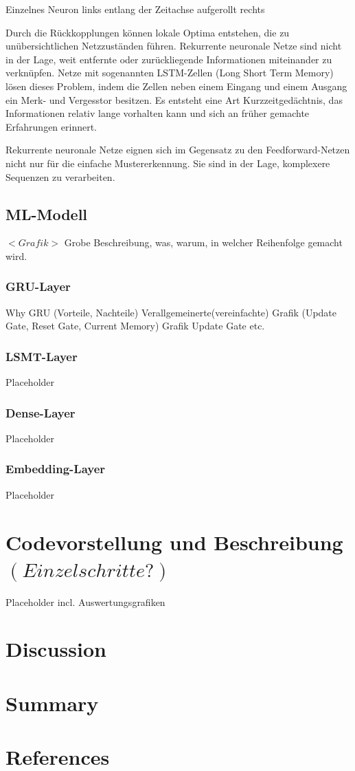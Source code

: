 \documentclass[12pt,a4paper]{article}
\begin{document}
Einzelnes Neuron links       \tab    entlang der Zeitachse aufgerollt rechts


Durch die Rückkopplungen können lokale Optima entstehen, die zu unübersichtlichen Netzzuständen führen. Rekurrente neuronale Netze sind nicht in der Lage, weit entfernte oder zurückliegende Informationen miteinander zu verknüpfen. Netze mit sogenannten LSTM-Zellen (Long Short Term Memory) lösen dieses Problem, indem die Zellen neben einem Eingang und einem Ausgang ein Merk- und Vergesstor besitzen. Es entsteht eine Art Kurzzeitgedächtnis, das Informationen relativ lange vorhalten kann und sich an früher gemachte Erfahrungen erinnert.

Rekurrente neuronale Netze eignen sich im Gegensatz zu den Feedforward-Netzen nicht nur für die einfache Mustererkennung. Sie sind in der Lage, komplexere Sequenzen zu verarbeiten. 

\subsection{ML-Modell}
$<Grafik>$ \newline
Grobe Beschreibung, was, warum, in welcher Reihenfolge gemacht wird.
\subsubsection{GRU-Layer}
Why GRU (Vorteile, Nachteile) \newline
Verallgemeinerte(vereinfachte) Grafik (Update Gate, Reset Gate, Current Memory)\newline
Grafik Update Gate\newline
etc.
\subsubsection{LSMT-Layer}
Placeholder
\subsubsection{Dense-Layer}
Placeholder
\subsubsection{Embedding-Layer}
Placeholder
\section{Codevorstellung und Beschreibung$(Einzelschritte?)$}
Placeholder incl. Auswertungsgrafiken
\newpage

\section{Discussion}
\section{Summary}
\section{References}
\end{document}
